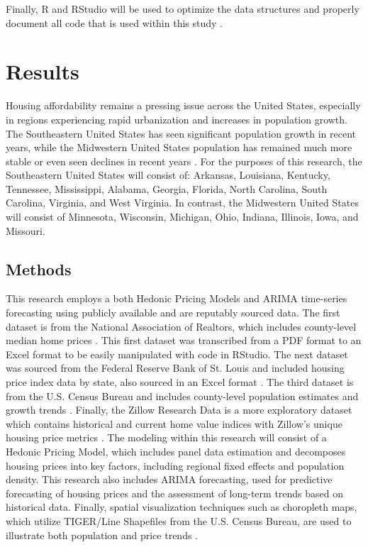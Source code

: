 \documentclass[journal,article,submit,pdftex,moreauthors]{Definitions/mdpi}
\begin{document}
Finally, R and RStudio will be used to optimize the data structures and properly document all code that is used within this study \citep{rcoreteam_2024_r}.


\section{Results}

Housing affordability remains a pressing issue across the United States, especially in regions experiencing rapid urbanization and increases in population growth. The Southeastern United States has seen significant population growth in recent years, while the Midwestern United States population has remained much more stable or even seen declines in recent years \citep{biernackalievestro_2023_southern}. For the purposes of this research, the Southeastern United States will consist of: Arkansas, Louisiana, Kentucky, Tennessee, Mississippi, Alabama, Georgia, Florida, North Carolina, South Carolina, Virginia, and West Virginia. In contrast, the Midwestern United States will consist of Minnesota, Wisconsin, Michigan, Ohio, Indiana, Illinois, Iowa, and Missouri. 

\subsection{Methods}

This research employs a both Hedonic Pricing Models and ARIMA time-series forecasting using publicly available and are reputably sourced data. The first dataset is from the National Association of Realtors, which includes county-level median home prices \citep{_2024_county}. This first dataset was transcribed from a PDF format to an Excel format to be easily manipulated with code in RStudio. The next dataset was sourced from the Federal Reserve Bank of St. Louis and included housing price index data by state, also sourced in an Excel format \citep{a2024_hpi}. The third dataset is from the U.S. Census Bureau and includes county-level population estimates and growth trends \citep{_2023_county}. Finally, the Zillow Research Data is a more exploratory dataset which contains historical and current home value indices with Zillow’s unique housing price metrics \citep{zillow_2024_housing}. The modeling within this research will consist of a Hedonic Pricing Model, which includes panel data estimation and decomposes housing prices into key factors, including regional fixed effects and population density. This research also includes ARIMA forecasting, used for predictive forecasting of housing prices and the assessment of long-term trends based on historical data. Finally, spatial visualization techniques such as choropleth maps, which utilize TIGER/Line Shapefiles from the U.S. Census Bureau, are used to illustrate both population and price trends \citep{unitedstatescensusbureau_2024_tigerline}.
\end{document}
